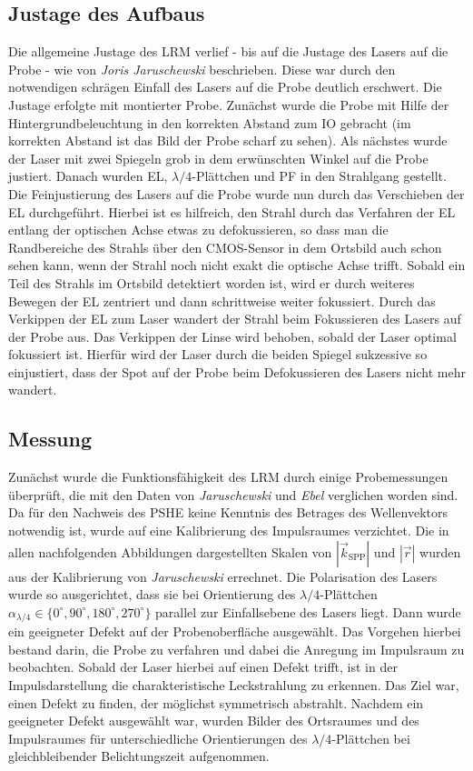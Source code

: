 \documentclass[titlepage,  ngerman]{article}
\begin{document}
	\subsection{Justage des Aufbaus}
	Die allgemeine Justage des LRM verlief - bis auf die Justage des Lasers auf die Probe - wie von \textit{Joris Jaruschewski} \cite{Jaruschewski.2020} beschrieben. Diese war durch den notwendigen schrägen Einfall des Lasers auf die Probe deutlich erschwert. Die Justage erfolgte mit montierter Probe. Zunächst wurde die Probe mit Hilfe der Hintergrundbeleuchtung in den korrekten Abstand zum IO gebracht (im korrekten Abstand ist das Bild der Probe scharf zu sehen). Als nächstes wurde der Laser mit zwei Spiegeln grob in dem erwünschten Winkel auf die Probe justiert. Danach wurden EL, $\lambda/4$-Plättchen und PF in den Strahlgang gestellt. Die Feinjustierung des Lasers auf die Probe wurde nun durch das Verschieben der EL durchgeführt. Hierbei ist es hilfreich, den Strahl durch das Verfahren der EL entlang der optischen Achse etwas zu defokussieren, so dass man die Randbereiche des Strahls über den CMOS-Sensor in dem Ortsbild auch schon sehen kann, wenn der Strahl noch nicht exakt die optische Achse trifft. Sobald ein Teil des Strahls im Ortsbild detektiert worden ist, wird er durch weiteres Bewegen der EL zentriert und dann schrittweise weiter fokussiert. Durch das Verkippen der EL zum Laser wandert der Strahl beim Fokussieren des Lasers auf der Probe aus. Das Verkippen der Linse wird behoben, sobald der Laser optimal fokussiert ist. Hierfür wird der Laser durch die beiden Spiegel sukzessive so einjustiert, dass der Spot auf der Probe beim Defokussieren des Lasers nicht mehr wandert.
	
		
	\subsection{Messung}
	Zunächst wurde die Funktionsfähigkeit des LRM durch einige Probemessungen überprüft, die mit den Daten von \textit{Jaruschewski} \cite{Jaruschewski.2020} und \textit{Ebel} \cite{ebel.2019} verglichen worden sind. Da für den Nachweis des PSHE keine Kenntnis des Betrages des Wellenvektors notwendig ist, wurde auf eine Kalibrierung des Impulsraumes verzichtet. Die in allen nachfolgenden Abbildungen dargestellten Skalen von $|\vec{k}_{\mathrm{SPP}}|$ und $|\vec{r}|$ wurden aus der Kalibrierung von \textit{Jaruschewski} errechnet. Die Polarisation des Lasers wurde so ausgerichtet, dass sie bei Orientierung des $\lambda/4$-Plättchen $\alpha_{\lambda/4} \in \{0^\circ, 90^\circ, 180^\circ, 270^\circ\}$ parallel zur Einfallsebene des Lasers liegt.  Dann wurde ein geeigneter Defekt auf der Probenoberfläche ausgewählt. Das Vorgehen hierbei bestand darin, die Probe zu verfahren und dabei die Anregung im Impulsraum zu beobachten. Sobald der Laser hierbei auf einen Defekt trifft, ist in der Impulsdarstellung die charakteristische Leckstrahlung zu erkennen. Das Ziel war, einen Defekt zu finden, der möglichst symmetrisch abstrahlt. Nachdem ein geeigneter Defekt ausgewählt war, wurden Bilder des Ortsraumes und des Impulsraumes für unterschiedliche Orientierungen des $\lambda/4$-Plättchen bei gleichbleibender Belichtungszeit aufgenommen.
\end{document}
